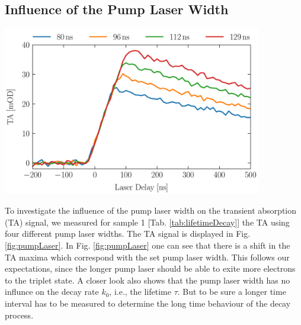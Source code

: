 \subsection{Influence of the Pump Laser Width}
\label{sub:pumpLaser}

\begin{center}
    \captionsetup{type = figure}
    \includegraphics[width = 0.85\textwidth]{Pictures/Evaluation/42/Pump-Laser.pdf}
    \label{fig:pumpLaser}
\end{center}

To investigate the influence of the pump laser width on the transient absorption (TA) signal, we measured for sample 1 [Tab. \ref{tab:lifetimeDecay}] the TA using four different pump laser widths. The TA signal is displayed in Fig. \ref{fig:pumpLaser}. In Fig. \ref{fig:pumpLaser} one can see that there is a shift in the TA maxima which correspond with the set pump laser width. This follows our expectations, since the longer pump laser should be able to exite more electrons to the triplet state. A closer look also shows that the pump laser width has no influnce on the decay rate $k_0$, i.e., the lifetime $\tau$. But to be sure a longer time interval has to be measured to determine the long time behaviour of the decay process.